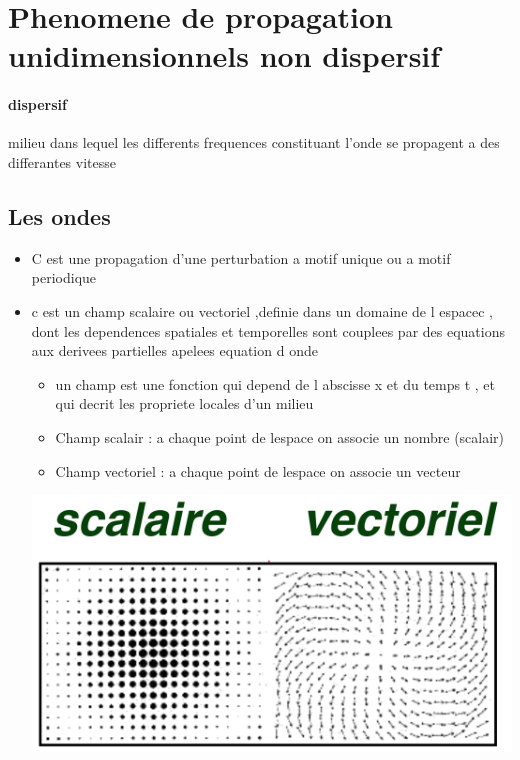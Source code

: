 \documentclass[12pt]{book}
\begin{document}
    \chapter{Phenomene de propagation unidimensionnels non dispersif}
        \subsubsection*{dispersif}
            milieu dans lequel les differents frequences constituant l'onde se propagent a des differantes vitesse  
        \section{Les ondes}
            \begin{itemize}
                \item C est une propagation d'une perturbation a motif unique ou a motif periodique
                \item c est un champ scalaire ou vectoriel ,definie dans un domaine de l espacec , dont les dependences spatiales et temporelles sont couplees par des equations aux derivees partielles apelees equation d onde
                    \begin{itemize}
                        \item un champ est une fonction qui depend de l abscisse x et du temps t , et qui decrit les propriete locales d'un milieu 
                        \item Champ scalair : a chaque point de lespace on associe un nombre (scalair)
                        \item Champ vectoriel : a chaque point de lespace on associe un vecteur 
                    \end{itemize}
                    \begin{center}
                        \includegraphics[width=0.4\linewidth]{pic/champscalairvectoriell.png}
                    \end{center}
            \end{itemize}
\end{document}
